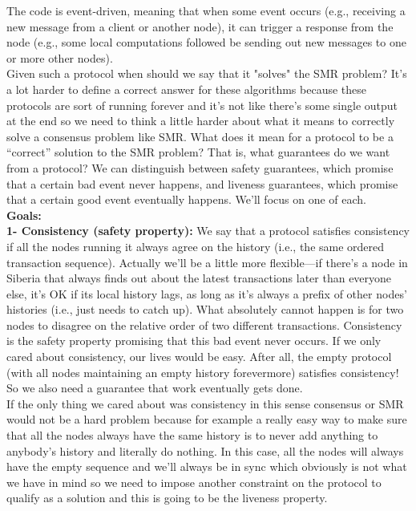 The code is event-driven, meaning that when some event occurs (e.g., receiving a new message from a client or another node), it can trigger a response from the node (e.g., some local computations followed be sending out new messages to one or more other nodes).\\


Given such a protocol when should we say that it "solves" the SMR problem? It's a lot harder to define a correct answer for these algorithms because these protocols are sort of
running forever
and it's not like there's some single
output at the end so we need to think a
little harder about what it means to
correctly solve a consensus problem like SMR.
What does it mean for a protocol to be a “correct” solution to the SMR problem?
That is, what guarantees do we want from a protocol? We can distinguish between safety
guarantees, which promise that a certain bad event never happens, and liveness guarantees,
which promise that a certain good event eventually happens. We’ll focus on one of each.\\
\noindent
\textbf{Goals:}\\

\noindent
\textbf{1- Consistency (safety property):} We say that a protocol satisfies consistency if all the nodes
running it always agree on the history (i.e., the same ordered transaction sequence). Actually
we’ll be a little more flexible—if there’s a node in Siberia that always finds out about the
latest transactions later than everyone else, it’s OK if its local history lags, as long as it’s
always a prefix of other nodes’ histories (i.e., just needs to catch up). What absolutely
cannot happen is for two nodes to disagree on the relative order of two different transactions.
Consistency is the safety property promising that this bad event never occurs.
If we only cared about consistency, our lives would be easy. After all, the empty protocol
(with all nodes maintaining an empty history forevermore) satisfies consistency! So we also need a guarantee that work eventually gets done.\\

If the only thing we cared about was
consistency in this sense consensus or
SMR would not
be a hard problem
because for example a really easy way to make
sure that all the nodes always have the
same history is to 
never add anything to anybody's history and 
literally do nothing. In this case, all the nodes
will always have the empty sequence and
we'll always be in sync which
obviously is not what we have in
mind so we need to impose another
constraint on the protocol to qualify as
a solution and this is going to be the
liveness property.\\

